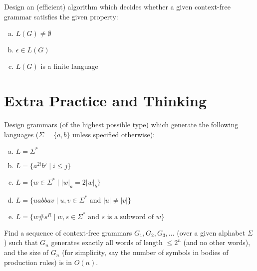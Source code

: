 \documentclass[a4paper,12pt]{amsart}
\begin{document}
\begin{problem}
    
    Design an (efficient) algorithm which decides whether a given context-free grammar satisfies the given property:
    
    \vspace{-6pt}
    \begin{multicols}{3}
    \begin{enumerate}[(a)]
        \item $L(G)\neq\emptyset$
        \item $\epsilon\in L(G)$
        \item $L(G)$ is a finite language
    \end{enumerate}
    \end{multicols}

\end{problem}


\section*{Extra Practice and Thinking}


\medskip\begin{problem}

    Design grammars (of the highest possible type) which generate the following languages ($\Sigma=\{a,b\}$ unless specified otherwise):
    
    \begin{enumerate}[(a)]    
        \item $L=\Sigma^*$        
        \item $L=\{a^{2i}b^j\mid i\leq j\}$
        \item $L=\{w\in\Sigma^*\mid |w|_a = 2|w|_b\}$        
        \item $L=\{uabbav\mid u,v\in\Sigma^*\text{ and }|u|\neq|v|\}$ 
        \item $L = \{w \# s^R \mid w,s\in\Sigma^*\text{ and $s$ is a subword of $w$}\}$
    \end{enumerate}

\end{problem}


\medskip\begin{problem}
    
    Find a sequence of context-free grammars $G_1,G_2,G_3,\dots$ (over a given alphabet $\Sigma$) such that $G_n$ generates exactly all words of length $\leq 2^n$ (and no other words), and the size of $G_n$ (for simplicity, say the number of symbols in bodies of production rules) is in $O(n)$.
    

\end{problem}
\end{document}
